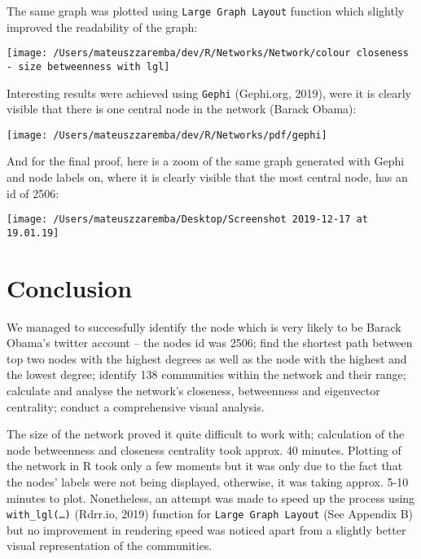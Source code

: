\documentclass[
]{article}
\begin{document}
The same graph was plotted using \texttt{Large\ Graph\ Layout} function
which slightly improved the readability of the graph:

\begin{center}\texttt{[image: /Users/mateuszzaremba/dev/R/Networks/Network/colour closeness - size betweenness with lgl]} \end{center}

Interesting results were achieved using \texttt{Gephi} (Gephi.org,
2019), were it is clearly visible that there is one central node in the
network (Barack Obama):

\begin{center}\texttt{[image: /Users/mateuszzaremba/dev/R/Networks/pdf/gephi]} \end{center}

And for the final proof, here is a zoom of the same graph generated with
Gephi and node labels on, where it is clearly visible that the most
central node, has an id of 2506:

\begin{center}\texttt{[image: /Users/mateuszzaremba/Desktop/Screenshot 2019-12-17 at 19.01.19]} \end{center}

\hypertarget{conclusion}{%
\section{Conclusion}\label{conclusion}}

We managed to successfully identify the node which is very likely to be
Barack Obama's twitter account -- the nodes id was 2506; find the
shortest path between top two nodes with the highest degrees as well as
the node with the highest and the lowest degree; identify 138
communities within the network and their range; calculate and analyse
the network's closeness, betweenness and eigenvector centrality; conduct
a comprehensive visual analysis.

The size of the network proved it quite difficult to work with;
calculation of the node betweenness and closeness centrality took
approx. 40 minutes. Plotting of the network in R took only a few moments
but it was only due to the fact that the nodes' labels were not being
displayed, otherwise, it was taking approx. 5-10 minutes to plot.
Nonetheless, an attempt was made to speed up the process using
\texttt{with\_lgl(\ldots{})} (Rdrr.io, 2019) function for
\texttt{Large\ Graph\ Layout} (See Appendix B) but no improvement in
rendering speed was noticed apart from a slightly better visual
representation of the communities.
\end{document}

